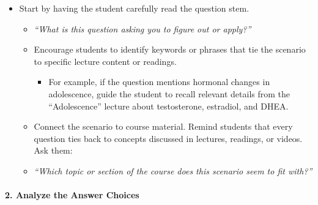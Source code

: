 \documentclass[
]{article}
\providecommand{\tightlist}{%
  \setlength{\itemsep}{0pt}\setlength{\parskip}{0pt}}
\begin{document}
\begin{itemize}
\tightlist
\item
  Start by having the student carefully read the question stem.

  \begin{itemize}
  \tightlist
  \item
    \emph{``What is this question asking you to figure out or apply?''}
  \item
    Encourage students to identify keywords or phrases that tie the scenario to specific lecture content or readings.

    \begin{itemize}
    \tightlist
    \item
      For example, if the question mentions hormonal changes in adolescence, guide the student to recall relevant details from the ``Adolescence'' lecture about testosterone, estradiol, and DHEA.
    \end{itemize}
  \item
    Connect the scenario to course material. Remind students that every question ties back to concepts discussed in lectures, readings, or videos. Ask them:
  \item
    \emph{``Which topic or section of the course does this scenario seem to fit with?''}
  \end{itemize}
\end{itemize}

\hypertarget{analyze-the-answer-choices}{%
\paragraph*{2. Analyze the Answer Choices}\label{analyze-the-answer-choices}}
\end{document}
